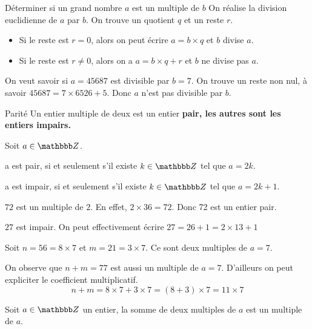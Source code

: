 \documentclass[10pt,a4paper,openany,twoside,prof]{book}
\begin{document}
\begin{methode}{Déterminer si un grand nombre $a$ est un multiple de $b$}{}
  On réalise la division euclidienne de $a$ par $b$. On trouve un quotient $q$ et un reste $r$.
  \begin{itemize}
	\item
	Si le reste est $r=0$, alors on peut écrire $a=b\times q$ et $b$ divise $a$.
	\item
	Si le reste est $r\ne 0$, alors on a $a=b\times q+r$ et $b$ ne divise pas $a$.
  \end{itemize}
\end{methode}

\begin{ex}{}{}
  On veut savoir si $a=45687$ est divisible par $b=7$. On trouve un reste non nul, à savoir $45687=7\times6526+5$. Donc $a$ n'est pas divisible par $b$.
\end{ex}

\begin{defi}{Parité}{}
Un entier multiple de deux est un entier \bf{pair}, les autres sont les entiers \bf{impairs}.
\end{defi}

\begin{prop}{}{}
	Soit $a\in\Z$.

	a est pair, si et seulement s'il existe $k\in\Z$ tel que $a=2k$.

	a est impair, si et seulement s'il existe $k\in\Z$ tel que $a=2k+1$.
\end{prop}

\begin{ex}{}{}
$72$ est un multiple de $2$. En effet, $2\times 36 = 72$. Donc 72 est un entier pair.

$27$ est impair. On peut effectivement écrire $27 = 26+1 = 2\times13+1$
\end{ex}

\begin{ex}{}{}
	Soit $n=56 = 8\times7$ et $m=21=3\times7$. Ce sont deux multiples de $a= 7$.

	On observe que $n+m=77$ est aussi un multiple de $a=7$. D'ailleurs on peut expliciter le coefficient multiplicatif.
	$$n+m= 8\times7+3\times7 = (8+3)\times7=11\times7$$
\end{ex}

\begin{prop}{}{}
Soit $a\in\Z$ un entier, la somme de deux multiples de $a$ est un multiple de $a$.
\end{prop}
\end{document}
